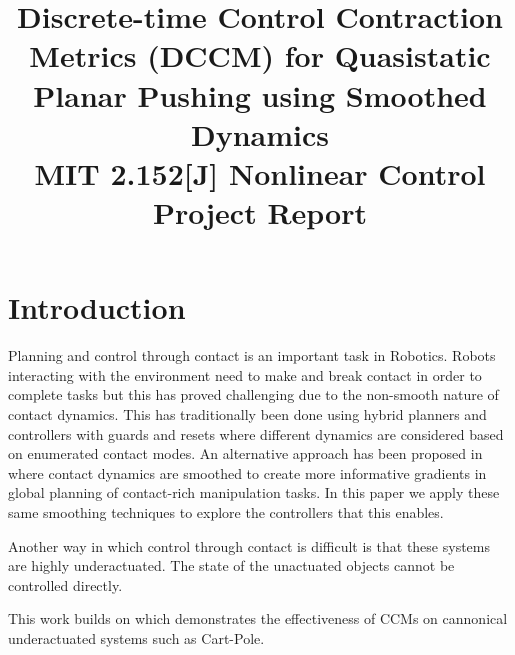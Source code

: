 \documentclass[conference]{IEEEtran}
\begin{document}
\title{Discrete-time Control Contraction Metrics (DCCM) for Quasistatic Planar Pushing using Smoothed Dynamics\\
{\footnotesize MIT 2.152[J] Nonlinear Control Project Report}
}

\author{
}

\maketitle

\begin{abstract}

\end{abstract}

\section{Introduction}
Planning and control through contact is an important task in Robotics. Robots interacting with the environment need to make and break contact in order to complete tasks but this has proved challenging due to the non-smooth nature of contact dynamics. This has traditionally been done using hybrid planners and controllers with guards and resets where different dynamics are considered based on enumerated contact modes. An alternative approach has been proposed in \autocite{pangGlobalPlanningContactRich2023} where contact dynamics are smoothed to create more informative gradients in global planning of contact-rich manipulation tasks. In this paper we apply these same smoothing techniques to explore the controllers that this enables.

Another way in which control through contact is difficult is that these systems are highly underactuated. The state of the unactuated objects cannot be controlled directly.



This work builds on \autocite{manchesterUnifyingRobotTrajectory2018} which demonstrates the effectiveness of CCMs on cannonical underactuated systems such as Cart-Pole.
\end{document}
